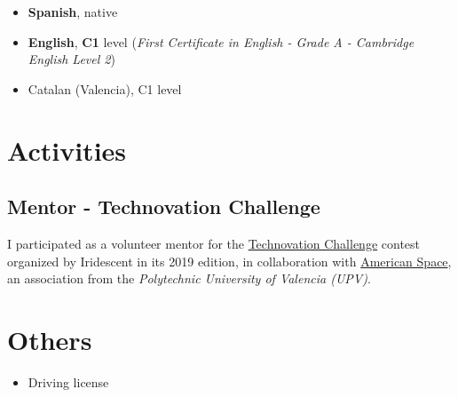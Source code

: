 \documentclass[letterpaper, 12pt, dvipsnames]{article}
\newcommand{\uni}{{\uniFull} ({\uniShort})}
\newcommand{\uniFull}{Polytechnic University of Valencia}
\newcommand{\uniShort}{UPV}
\newcommand{\fce}{\emph{First Certificate in English - Grade A - Cambridge English Level 2}}
\begin{document}
\begin{itemize}
    \item \textbf{Spanish}, native
    \item \textbf{English}, \textbf{C1} level (\fce)
    \item Catalan (Valencia), C1 level
\end{itemize}

\section*{Activities}

\subsection*{Mentor - Technovation Challenge}

I participated as a volunteer mentor for the \href{https://technovationchallenge.org/}{Technovation Challenge} contest organized by Iridescent in its 2019 edition, in collaboration with \href{https://americanspacev.upv.es/}{American Space}, an association from the \emph{\uni}.

\section*{Others}

\begin{itemize}
    \item Driving license
\end{itemize}
\end{document}
